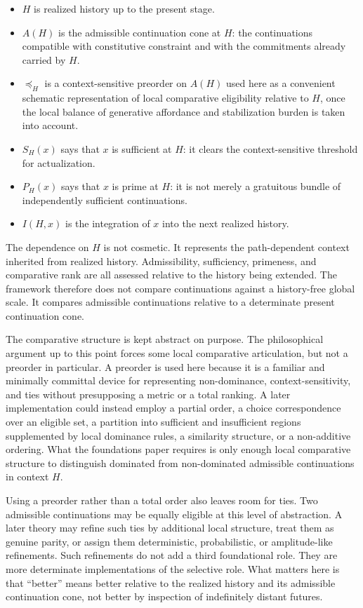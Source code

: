 \documentclass[11pt]{article}
\theoremstyle{foundation}
\begin{document}
\begin{itemize}
    \item $H$ is realized history up to the present stage.
    \item $A(H)$ is the admissible continuation cone at $H$: the continuations compatible with constitutive constraint and with the commitments already carried by $H$.
    \item $\preceq_H$ is a context-sensitive preorder on $A(H)$ used here as a convenient schematic representation of local comparative eligibility relative to $H$, once the local balance of generative affordance and stabilization burden is taken into account.
    \item $S_H(x)$ says that $x$ is sufficient at $H$: it clears the context-sensitive threshold for actualization.
    \item $P_H(x)$ says that $x$ is prime at $H$: it is not merely a gratuitous bundle of independently sufficient continuations.
    \item $I(H,x)$ is the integration of $x$ into the next realized history.
\end{itemize}

The dependence on $H$ is not cosmetic. It represents the path-dependent context inherited from realized history. Admissibility, sufficiency, primeness, and comparative rank are all assessed relative to the history being extended. The framework therefore does not compare continuations against a history-free global scale. It compares admissible continuations relative to a determinate present continuation cone.

The comparative structure is kept abstract on purpose. The philosophical argument up to this point forces some local comparative articulation, but not a preorder in particular. A preorder is used here because it is a familiar and minimally committal device for representing non-dominance, context-sensitivity, and ties without presupposing a metric or a total ranking. A later implementation could instead employ a partial order, a choice correspondence over an eligible set, a partition into sufficient and insufficient regions supplemented by local dominance rules, a similarity structure, or a non-additive ordering. What the foundations paper requires is only enough local comparative structure to distinguish dominated from non-dominated admissible continuations in context $H$.

Using a preorder rather than a total order also leaves room for ties. Two admissible continuations may be equally eligible at this level of abstraction. A later theory may refine such ties by additional local structure, treat them as genuine parity, or assign them deterministic, probabilistic, or amplitude-like refinements. Such refinements do not add a third foundational role. They are more determinate implementations of the selective role. What matters here is that ``better'' means better relative to the realized history and its admissible continuation cone, not better by inspection of indefinitely distant futures.
\end{document}
